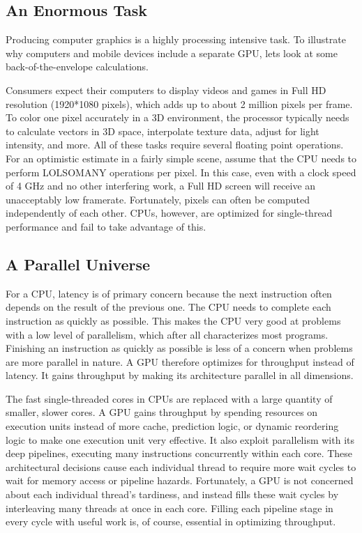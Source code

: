 \documentclass[../main/report.tex]{subfiles}
\begin{document}
\subsection{An Enormous Task}

Producing computer graphics is a highly processing intensive task.
To illustrate why computers and mobile devices include a separate GPU, lets look at some back-of-the-envelope calculations.

Consumers expect their computers to display videos and games in Full HD resolution (1920*1080 pixels), which adds up to about 2 million pixels per frame.
To color one pixel accurately in a 3D environment, the processor typically needs to calculate vectors in 3D space, interpolate texture data, adjust for light intensity, and more.
All of these tasks require several floating point operations.
For an optimistic estimate in a fairly simple scene, assume that the CPU needs to perform LOLSOMANY operations per pixel. 
In this case, even with a clock speed of 4 GHz and no other interfering work, a Full HD screen will receive an unacceptably low framerate.
Fortunately, pixels can often be computed independently of each other.
CPUs, however, are optimized for single-thread performance and fail to take advantage of this.

\subsection{A Parallel Universe}

For a CPU, latency is of primary concern because the next instruction often depends on the result of the previous one.
The CPU needs to complete each instruction as quickly as possible.
This makes the CPU very good at problems with a low level of parallelism, which after all characterizes most programs.
Finishing an instruction as quickly as possible is less of a concern when problems are more parallel in nature.
A GPU therefore optimizes for throughput instead of latency.
It gains throughput by making its architecture parallel in all dimensions.

The fast single-threaded cores in CPUs are replaced with a large quantity of smaller, slower cores.
A GPU gains throughput by spending resources on execution units instead of more cache, prediction logic, or dynamic reordering logic to make one execution unit very effective.
It also exploit parallelism with its deep pipelines, executing many instructions concurrently within each core.
These architectural decisions cause each individual thread to require more wait cycles to wait for memory access or pipeline hazards.
Fortunately, a GPU is not concerned about each individual thread's tardiness, and instead fills these wait cycles by interleaving many threads at once in each core.
Filling each pipeline stage in every cycle with useful work is, of course, essential in optimizing throughput.
\end{document}

